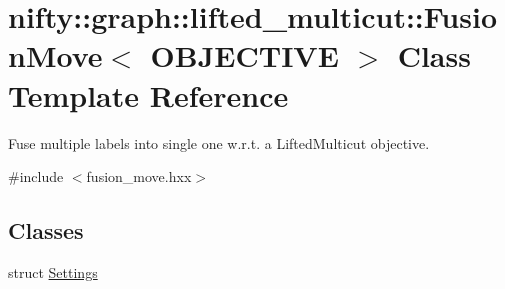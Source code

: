 \hypertarget{classnifty_1_1graph_1_1lifted__multicut_1_1FusionMove}{}\section{nifty\+:\+:graph\+:\+:lifted\+\_\+multicut\+:\+:Fusion\+Move$<$ O\+B\+J\+E\+C\+T\+I\+V\+E $>$ Class Template Reference}
\label{classnifty_1_1graph_1_1lifted__multicut_1_1FusionMove}


Fuse multiple labels into single one w.\+r.\+t. a Lifted\+Multicut objective.  




{\ttfamily \#include $<$fusion\+\_\+move.\+hxx$>$}

\subsection*{Classes}
\begin{DoxyCompactItemize}
\item 
struct \hyperlink{structnifty_1_1graph_1_1lifted__multicut_1_1FusionMove_1_1Settings}{Settings}
\end{DoxyCompactItemize}
